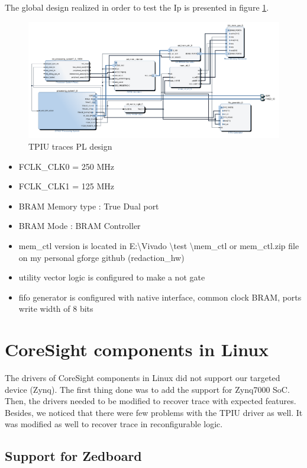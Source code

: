\documentclass[10pt,a4paper, oneside]{memoir}
\begin{document}
The global design realized in order to test the Ip is presented in figure \ref{fig:tpiu_trace}.
\begin{figure}
\centering
\includegraphics[scale=.6, keepaspectratio]{images/design_test_tpiu_traces}
\caption{TPIU traces PL design}
\label{fig:tpiu_trace}
\end{figure}

\begin{itemize}
\item FCLK\_CLK0 = 250 MHz
\item FCLK\_CLK1 = 125 MHz
\item BRAM Memory type : True Dual port
\item BRAM Mode : BRAM Controller
\item mem\_ctl version is located in E:\textbackslash Vivado \textbackslash test \textbackslash mem\_ctl or mem\_ctl.zip file on my personal gforge github (redaction\_hw) 
\item utility vector logic is configured to make a not gate
\item fifo generator is configured with native interface, common clock BRAM, ports write width of 8 bits
\end{itemize}



\chapter{CoreSight components in Linux}
\label{chap:CS_components_Linux}
The drivers of CoreSight components in Linux did not support our targeted device (Zynq). The first thing done was to add the support for Zynq7000 SoC. Then, the drivers needed to be modified to recover trace with expected features. Besides, we noticed that there were few problems with the TPIU driver as well. It was modified as well to recover trace in reconfigurable logic.
\section{Support for Zedboard}
\end{document}
